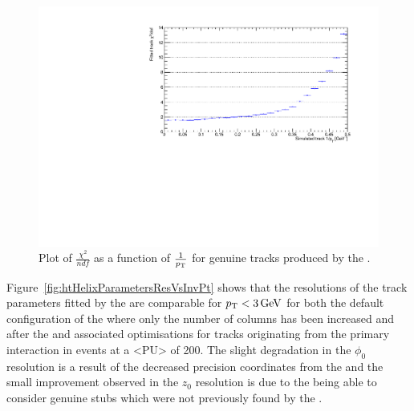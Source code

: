 \begin{figure}[tbp]
\centering
\includegraphics[width=\textwidth]{figs/tk-upgrade/results-lowPtTracking/kfChi2NdfVsInvPtFlatGeometry_5000.pdf}
\caption{Plot of $\frac{\chi^{2}}{ndf}$ as a function of $\frac{1}{p_{\mathrm{T}}}$ for genuine tracks produced by the \KF.}
\label{fig:2GeVFlatChi2Ndf}
\end{figure}

Figure~\ref{fig:htHelixParametersResVsInvPt} shows that the resolutions of the track parameters fitted by the \KF are comparable for $p_{\mathrm{T}} < 3\,\text{Ge\hspace{-.08em}V}$ for both the default configuration of the \HT where only the number of \qpt columns has been increased and after the \HT and associated \KF optimisations for tracks originating from the primary interaction in \ttbar events at a <PU> of 200.
The slight degradation in the $\phi_{0}$ resolution is a result of the decreased precision coordinates from the \HT and the small improvement observed in the $z_{0}$ resolution is due to the \KF being able to consider genuine stubs which were not previously found by the \HT.

